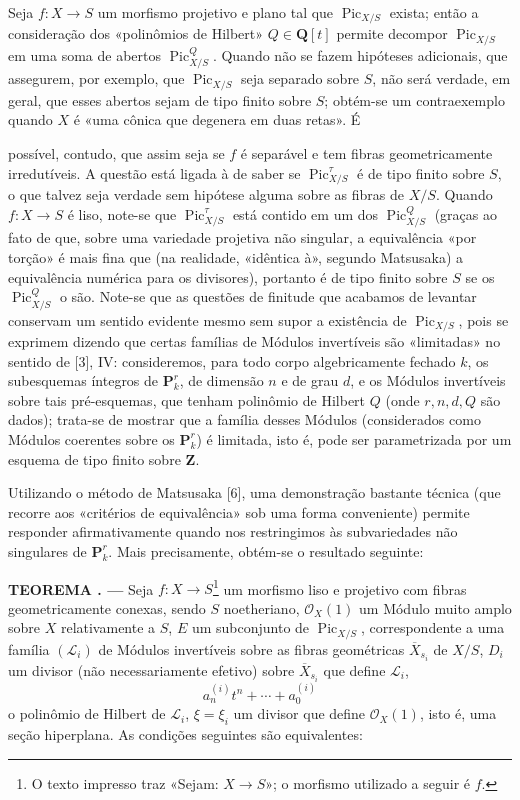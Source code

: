 \documentclass[11pt,twoside,openany]{book}
\numberwithin{equation}{section}
\newcommand{\src}[1]{%
  \phantomsection\hypertarget{src:#1}{}%
  \marginpar{\raggedleft\footnotesize\sffamily #1}%
}
\theoremstyle{plain}
\theoremstyle{definition}
\theoremstyle{remark}
\newcommand{\result}[2]{%
  \par\medskip\noindent\textbf{#1%
  \if\relax\detokenize{#2}\relax\else\space#2\fi. ---}\enspace
}
\newcommand{\FgaUnitKey}{frontmatter}
\renewcommand{\src}[1]{%
  \phantomsection\hypertarget{src:\FgaUnitKey:#1}{}%
  \marginpar{\raggedleft\footnotesize\sffamily #1}%
}
\begin{document}
Seja $f:X\longrightarrow S$ um morfismo projetivo e plano tal que
$\operatorname{Pic}_{X/S}$ exista; então a consideração dos «polinômios de
Hilbert» $Q\in\mathbf Q[t]$ permite decompor $\operatorname{Pic}_{X/S}$ em uma
soma de abertos $\operatorname{Pic}_{X/S}^Q$. Quando não se fazem hipóteses
adicionais, que assegurem, por exemplo, que $\operatorname{Pic}_{X/S}$ seja
separado sobre $S$, não será verdade, em geral, que esses abertos sejam de tipo
finito sobre $S$; obtém-se um contraexemplo quando $X$ é «uma cônica que
degenera em duas retas». É
\src{242}
possível, contudo, que assim seja se $f$ é separável e tem fibras
geometricamente irredutíveis. A questão está ligada à de saber se
$\operatorname{Pic}_{X/S}^\tau$ é de tipo finito sobre $S$, o que talvez seja
verdade sem hipótese alguma sobre as fibras de $X/S$. Quando
$f:X\longrightarrow S$ é liso, note-se que
$\operatorname{Pic}_{X/S}^\tau$ está contido em um dos
$\operatorname{Pic}_{X/S}^Q$ (graças ao fato de que, sobre uma variedade
projetiva não singular, a equivalência «por torção» é mais fina que (na
realidade, «idêntica à», segundo Matsusaka) a equivalência numérica para os
divisores), portanto é de tipo finito sobre $S$ se os
$\operatorname{Pic}_{X/S}^Q$ o são. Note-se que as questões de finitude que
acabamos de levantar conservam um sentido evidente mesmo sem supor a existência
de $\operatorname{Pic}_{X/S}$, pois se exprimem dizendo que certas famílias de
Módulos invertíveis são «limitadas» no sentido de [3], IV: consideremos, para
todo corpo algebricamente fechado $k$, os subesquemas íntegros de
$\mathbf P_k^r$, de dimensão $n$ e de grau $d$, e os Módulos invertíveis sobre
tais pré-esquemas, que tenham polinômio de Hilbert $Q$ (onde $r,n,d,Q$ são
dados); trata-se de mostrar que a família desses Módulos (considerados como
Módulos coerentes sobre os $\mathbf P_k^r$) é limitada, isto é, pode ser
parametrizada por um esquema de tipo finito sobre $\mathbf Z$.

Utilizando o método de Matsusaka [6], uma demonstração bastante técnica (que
recorre aos «critérios de equivalência» sob uma forma conveniente) permite
responder afirmativamente quando nos restringimos às subvariedades não
singulares de $\mathbf P_k^r$. Mais precisamente, obtém-se o resultado seguinte:

\result{TEOREMA}{4.1} Seja $f:X\longrightarrow S$\footnote{O texto impresso
traz «Sejam: $X\longrightarrow S$»; o morfismo utilizado a seguir é $f$.} um
morfismo liso e projetivo com fibras geometricamente conexas, sendo $S$
noetheriano, $\mathcal O_X(1)$ um Módulo muito amplo sobre $X$ relativamente a
$S$, $E$ um subconjunto de $\operatorname{Pic}_{X/S}$, correspondente a uma
família $(\mathcal L_i)$ de Módulos invertíveis sobre as fibras geométricas
$\overline X_{s_i}$ de $X/S$, $D_i$ um divisor (não necessariamente efetivo)
sobre $\overline X_{s_i}$ que define $\mathcal L_i$,
\[
a_n^{(i)}t^n+\cdots+a_0^{(i)}
\]
o polinômio de Hilbert de $\mathcal L_i$, $\xi=\xi_i$ um divisor que define
$\mathcal O_X(1)$, isto é, uma seção hiperplana. As condições seguintes são
equivalentes:
\end{document}
